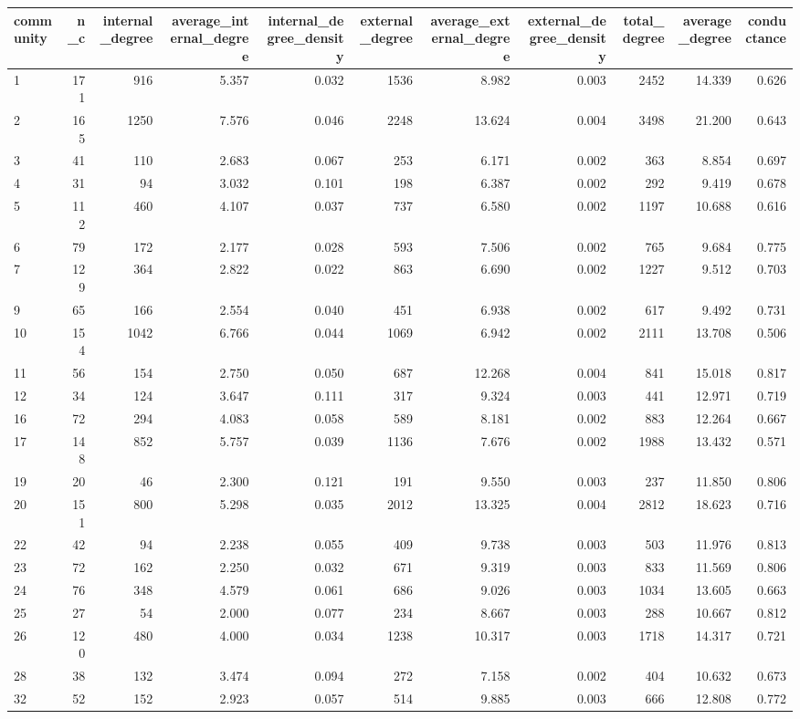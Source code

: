 \begin{table}[ht]
\centering
\begin{adjustbox}{max width=\textwidth}
\begin{tabular}{lrrrrrrrrrr}
  \hline
community & n\_c & internal\_degree & average\_internal\_degree & internal\_degree\_density & external\_degree & average\_external\_degree & external\_degree\_density & total\_degree & average\_degree & conductance \\ 
  \hline
1 & 171 & 916 & 5.357 & 0.032 & 1536 & 8.982 & 0.003 & 2452 & 14.339 & 0.626 \\ 
  2 & 165 & 1250 & 7.576 & 0.046 & 2248 & 13.624 & 0.004 & 3498 & 21.200 & 0.643 \\ 
  3 & 41 & 110 & 2.683 & 0.067 & 253 & 6.171 & 0.002 & 363 & 8.854 & 0.697 \\ 
  4 & 31 & 94 & 3.032 & 0.101 & 198 & 6.387 & 0.002 & 292 & 9.419 & 0.678 \\ 
  5 & 112 & 460 & 4.107 & 0.037 & 737 & 6.580 & 0.002 & 1197 & 10.688 & 0.616 \\ 
  6 & 79 & 172 & 2.177 & 0.028 & 593 & 7.506 & 0.002 & 765 & 9.684 & 0.775 \\ 
  7 & 129 & 364 & 2.822 & 0.022 & 863 & 6.690 & 0.002 & 1227 & 9.512 & 0.703 \\ 
  9 & 65 & 166 & 2.554 & 0.040 & 451 & 6.938 & 0.002 & 617 & 9.492 & 0.731 \\ 
  10 & 154 & 1042 & 6.766 & 0.044 & 1069 & 6.942 & 0.002 & 2111 & 13.708 & 0.506 \\ 
  11 & 56 & 154 & 2.750 & 0.050 & 687 & 12.268 & 0.004 & 841 & 15.018 & 0.817 \\ 
  12 & 34 & 124 & 3.647 & 0.111 & 317 & 9.324 & 0.003 & 441 & 12.971 & 0.719 \\ 
  16 & 72 & 294 & 4.083 & 0.058 & 589 & 8.181 & 0.002 & 883 & 12.264 & 0.667 \\ 
  17 & 148 & 852 & 5.757 & 0.039 & 1136 & 7.676 & 0.002 & 1988 & 13.432 & 0.571 \\ 
  19 & 20 & 46 & 2.300 & 0.121 & 191 & 9.550 & 0.003 & 237 & 11.850 & 0.806 \\ 
  20 & 151 & 800 & 5.298 & 0.035 & 2012 & 13.325 & 0.004 & 2812 & 18.623 & 0.716 \\ 
  22 & 42 & 94 & 2.238 & 0.055 & 409 & 9.738 & 0.003 & 503 & 11.976 & 0.813 \\ 
  23 & 72 & 162 & 2.250 & 0.032 & 671 & 9.319 & 0.003 & 833 & 11.569 & 0.806 \\ 
  24 & 76 & 348 & 4.579 & 0.061 & 686 & 9.026 & 0.003 & 1034 & 13.605 & 0.663 \\ 
  25 & 27 & 54 & 2.000 & 0.077 & 234 & 8.667 & 0.003 & 288 & 10.667 & 0.812 \\ 
  26 & 120 & 480 & 4.000 & 0.034 & 1238 & 10.317 & 0.003 & 1718 & 14.317 & 0.721 \\ 
  28 & 38 & 132 & 3.474 & 0.094 & 272 & 7.158 & 0.002 & 404 & 10.632 & 0.673 \\ 
  32 & 52 & 152 & 2.923 & 0.057 & 514 & 9.885 & 0.003 & 666 & 12.808 & 0.772 \\ 
  

\end{tabular}
\end{adjustbox}
\end{table}
